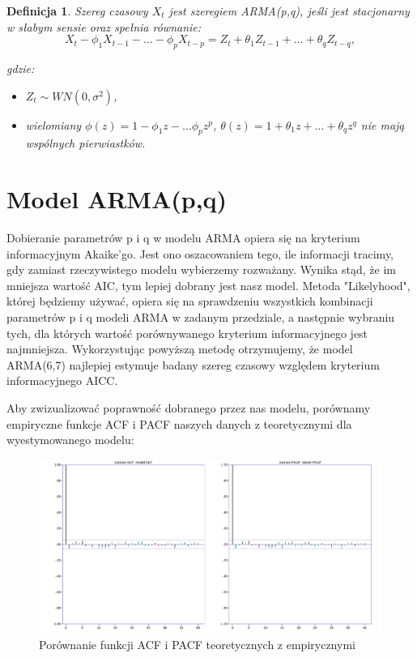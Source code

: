 \documentclass[fleqn]{article}
\theoremstyle{plain}
\newtheorem*{theorem*}{Definicja}
\begin{document}
    \begin{theorem*}
        Szereg czasowy $X_{t}$ jest szeregiem ARMA(p,q), jeśli jest stacjonarny w słabym sensie
        oraz spełnia równanie:\\

        $$
        X_{t} - \phi_1 X_{t-1} - \ldots - \phi_{p} X_{t-p} = Z_{t} + \theta_1 Z_{t-1} + \ldots + \theta_{q} Z_{t-q},
        $$

        gdzie:
        \begin{itemize}
            \item $Z_{t} \sim WN(0, \sigma^2)$,
            \item wielomiany $\phi(z) = 1 - \phi_1 z - \ldots \phi_{p} z^{p}$,
            $\theta(z) = 1 + \theta_1 z + \ldots + \theta_{q} z^{q}$ nie mają wspólnych pierwiastków.
        \end{itemize}
    \end{theorem*}

    \vskip 0.2in
    \section*{Model ARMA(p,q)} 
    Dobieranie parametrów p i q w modelu ARMA opiera się na kryterium informacyjnym Akaike’go. Jest ono oszacowaniem tego, ile informacji tracimy, gdy
    zamiast rzeczywistego modelu wybierzemy rozważany. Wynika stąd, że im mniejsza wartość AIC, tym lepiej dobrany jest nasz model.
    Metoda "Likelyhood", której będziemy używać, opiera się na sprawdzeniu wszystkich kombinacji parametrów p i q modeli ARMA w zadanym przedziale, a następnie wybraniu tych, dla których
    wartość porównywanego kryterium informacyjnego jest najmniejsza. 
    Wykorzystując powyższą metodę otrzymujemy, że model ARMA(6,7) najlepiej estymuje badany szereg czasowy względem kryterium informacyjnego AICC.

    \newpage

    Aby zwizualizować poprawność dobranego przez nas modelu, porównamy empiryczne funkcje ACF i PACF naszych danych
    z teoretycznymi dla wyestymowanego modelu:

    \begin{figure}[H]
        \centering
        \includegraphics[width=1\textwidth]{acv_pacf_estimeted.png}
        \caption{Porównanie funkcji ACF i PACF teoretycznych z empirycznymi}
        \label{fig:3 acv_pacf_estimeted.png}
    \end{figure}
\end{document}
